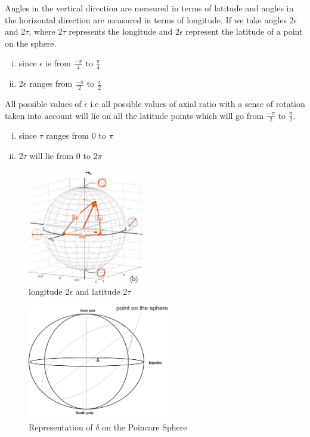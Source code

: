 Angles in the vertical direction are measured in terms of latitude and angles in the horizontal direction are measured in terms of longitude. If we take angles 2$\epsilon$ and 2$\tau$, where 2$\tau$ represents the longitude and 2$\epsilon$ represent the latitude of a point on the sphere.
\begin{enumerate}[(i)]
\item	since $\epsilon$ is from $\frac{-\pi}{4}$ to $\frac{\pi}{4}$
\item 	2$\epsilon$ ranges from $\frac{-\pi}{2}$ to $\frac{\pi}{2}$
\end{enumerate}
All possible values of $\epsilon$ i.e all possible values of axial ratio with a sense of rotation taken into account will lie on all the latitude points which will go from $\frac{-\pi}{2}$ to $\frac{\pi}{2}$. 
\begin{enumerate}[(i)]
\item 	since $\tau$ ranges from 0 to $\pi$
\item 	2$\tau$ will lie from 0 to 2$\pi$
\end{enumerate}
\begin{figure}[h]
\centering
\includegraphics[height=5cm]{./graphics/sphere}
\caption{longitude 2$\epsilon$ and latitude 2$\tau$}
\end{figure}
\begin{figure}[h]
\centering
\includegraphics[height=5cm]{./graphics/SPHERE001}
\caption{Representation of $\delta$ on the Poincare Sphere}
\label{fig:sphere001}
\end{figure}

